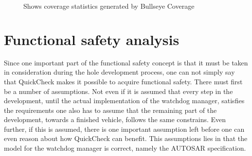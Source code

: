 \begin{figure}[!ht]
  \setlength\fboxsep{0pt}
  \setlength\fboxrule{0.5pt}
  \caption{Shows coverage statistics generated by Bullseye Coverage}
  \label{FIG:BULLSEYE}
\end{figure}


\section{Functional safety analysis}
Since one important part of the functional safety concept is that it must be
taken in consideration during the hole development process, one can not simply
say that QuickCheck makes it possible to acquire functional safety. There must
first be a number of assumptions. Not even if it is assumed that
every step in the development, until the actual implementation of the watchdog
manager, satisfies the requirements one also has to assume that the remaining
part of the development, towards a finished vehicle, follows the same
constrains. Even further, if this is assumed, there is one important
assumption left before
one can even reason about how QuickCheck can benefit.
This assumptions lies in that the model for the watchdog
manager is correct, namely the AUTOSAR specification.

